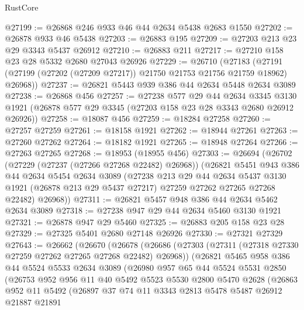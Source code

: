 \begin{lexlean}{RustCore}
\begin{coremodule}
@27199 := @26868 @246 @933 @46 @44 @2634 @5438 @2683 @1550
@27202 := @26878 @933 @46 @5438
@27203 := @26883 @195
@27209 := @27203 @213 @23 @29 @3343 @5437 @26912
@27210 := @26883 @211
@27217 := @27210 @158 @23 @28 @5332 @2680 @27043 @26926
@27229 := @26710
    (@27183 (@27191 (@27199 (@27202 (@27209 @27217)) @21750 @21753 @21756 @21759 @18962) @26968))
@27237 := @26821 @5443 @939 @386 @44 @2634 @5448 @2634 @3089
@27238 := @26868 @456
@27257 := @27238
    @577
    @29
    @44
    @2634
    @3345
    @3130
    @1921
    (@26878 @577 @29 @3345 (@27203 @158 @23 @28 @3343 @2680 @26912 @26926))
@27258 := @18087 @456
@27259 := @18284 @27258
@27260 := @27257 @27259
@27261 := @18158 @1921
@27262 := @18944 @27261
@27263 := @27260 @27262
@27264 := @18182 @1921
@27265 := @18948 @27264
@27266 := @27263 @27265
@27268 := @18953 (@18955 @456)
@27303 := @26694
    (@26702
      (@27229 (@27237 (@27266 @27268 @22482) @26968))
      (@26821
        @5451
        @943
        @386
        @44
        @2634
        @5454
        @2634
        @3089
        (@27238
          @213
          @29
          @44
          @2634
          @5437
          @3130
          @1921
          (@26878 @213 @29 @5437 @27217)
          @27259
          @27262
          @27265
          @27268
          @22482)
        @26968))
@27311 := @26821 @5457 @948 @386 @44 @2634 @5462 @2634 @3089
@27318 := @27238 @947 @29 @44 @2634 @5460 @3130 @1921
@27321 := @26878 @947 @29 @5460
@27325 := @26883 @205 @158 @23 @28
@27329 := @27325 @5401 @2680 @27148 @26926
@27330 := @27321 @27329
@27643 := @26662
    (@26670
      (@26678
        (@26686
          (@27303 (@27311 (@27318 @27330 @27259 @27262 @27265 @27268 @22482) @26968))
          (@26821
            @5465
            @958
            @386
            @44
            @5524
            @5533
            @2634
            @3089
            (@26980
              @957
              @65
              @44
              @5524
              @5531
              @2850
              (@26753
                @952
                @956
                @11
                @40
                @5492
                @5523
                @5530
                @2800
                @5470
                @2628
                (@26863
                  @952
                  @11
                  @5492
                  (@26897
                    @37
                    @74
                    @11
                    @3343
                    @2813
                    @5478
                    @5487
                    @26912
                    @21887
                    @21891

\end{coremodule}
\end{lexlean}
